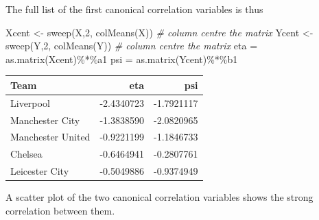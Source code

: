 \documentclass[
]{book}
\newenvironment{Shaded}{\begin{snugshade}}{\end{snugshade}}
\newcommand{\AttributeTok}[1]{\textcolor[rgb]{0.77,0.63,0.00}{#1}}
\newcommand{\CommentTok}[1]{\textcolor[rgb]{0.56,0.35,0.01}{\textit{#1}}}
\newcommand{\DecValTok}[1]{\textcolor[rgb]{0.00,0.00,0.81}{#1}}
\newcommand{\FunctionTok}[1]{\textcolor[rgb]{0.00,0.00,0.00}{#1}}
\newcommand{\NormalTok}[1]{#1}
\newcommand{\OtherTok}[1]{\textcolor[rgb]{0.56,0.35,0.01}{#1}}
\newcommand{\SpecialCharTok}[1]{\textcolor[rgb]{0.00,0.00,0.00}{#1}}
\theoremstyle{definition}
\theoremstyle{definition}
\theoremstyle{definition}
\theoremstyle{definition}
\theoremstyle{remark}
\begin{document}
The full list of the first canonical correlation variables is thus

\begin{Shaded}
\begin{Highlighting}[]
\NormalTok{Xcent }\OtherTok{\textless{}{-}} \FunctionTok{sweep}\NormalTok{(X,}\DecValTok{2}\NormalTok{, }\FunctionTok{colMeans}\NormalTok{(X)) }\CommentTok{\# column centre the matrix}
\NormalTok{Ycent }\OtherTok{\textless{}{-}} \FunctionTok{sweep}\NormalTok{(Y,}\DecValTok{2}\NormalTok{, }\FunctionTok{colMeans}\NormalTok{(Y)) }\CommentTok{\# column centre the matrix}
\NormalTok{eta }\OtherTok{=} \FunctionTok{as.matrix}\NormalTok{(Xcent)}\SpecialCharTok{\%*\%}\NormalTok{a1}
\NormalTok{psi }\OtherTok{=} \FunctionTok{as.matrix}\NormalTok{(Ycent)}\SpecialCharTok{\%*\%}\NormalTok{b1}
\end{Highlighting}
\end{Shaded}

\begin{tabular}{lrr}
\toprule
Team & eta & psi\\
\midrule
Liverpool & -2.4340723 & -1.7921117\\
Manchester City & -1.3838590 & -2.0820965\\
Manchester United & -0.9221199 & -1.1846733\\
Chelsea & -0.6464941 & -0.2807761\\
Leicester City & -0.5049886 & -0.9374949\\
\bottomrule
\end{tabular}

A scatter plot of the two canonical correlation variables shows the strong correlation between them.

\begin{Shaded}
\end{Shaded}
\end{document}
